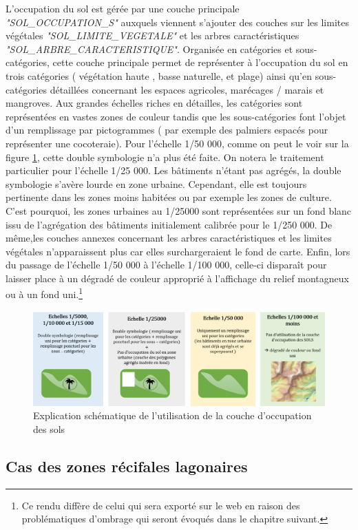 L'occupation du sol est gérée par une couche principale \textit{"SOL\_OCCUPATION\_S"} auxquels viennent s'ajouter des couches sur les limites végétales \textit{"SOL\_LIMITE\_VEGETALE"} et les arbres caractéristiques \textit{"SOL\_ARBRE\_CARACTERISTIQUE"}.  Organisée en catégories et sous-catégories, cette couche principale permet de représenter à l'occupation du sol en trois catégories ( végétation haute , basse naturelle, et plage) ainsi qu'en sous-catégories détaillées concernant les espaces agricoles, marécages / marais et mangroves. Aux grandes échelles riches en détailles, les catégories sont représentées en vastes zones de couleur tandis que les sous-catégories font l'objet d'un remplissage par pictogrammes ( par exemple des palmiers espacés pour représenter une cocoteraie). Pour l'échelle 1/50 000, comme on peut le voir sur la figure \ref{ocs}, cette double symbologie n'a plus été faite. On notera le traitement particulier pour l'échelle 1/25 000. Les bâtiments n'étant pas agrégés, la double symbologie s'avère lourde en zone urbaine.  Cependant, elle est toujours pertinente dans les zones moins habitées ou par exemple les zones de culture. C'est pourquoi, les zones urbaines au 1/25000 sont représentées sur un fond blanc issu de l'agrégation des bâtiments initialement calibrée pour le 1/250 000. De même,les couches annexes concernant les arbres caractéristiques et les limites végétales n'apparaissent plus car elles surchargeraient le fond de carte. Enfin, lors du passage de l'échelle 1/50 000 à l'échelle 1/100 000, celle-ci disparaît pour laisser place à un dégradé de couleur approprié à l'affichage du relief montagneux ou à un fond uni.\footnote{Ce rendu diffère de celui qui sera exporté sur le web en raison des problématiques d'ombrage qui seront évoqués dans le chapitre suivant.}
\begin{figure}[ht]
\centering
\includegraphics[width=\linewidth]{images/chap2/OCS.png}
\caption{Explication schématique de l'utilisation de la couche d'occupation des sols}
\label{ocs}
\end{figure}

\subsection{Cas des zones récifales lagonaires}

